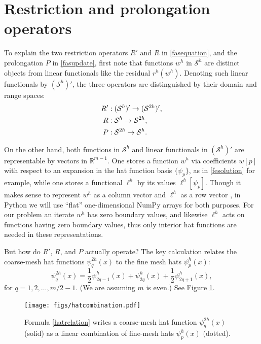 \documentclass[letterpaper,final,12pt,reqno]{amsart}
\newcommand{\RR}{\mathbb{R}}
\begin{document}
\section{Restriction and prolongation operators} \label{sec:restrictionprolongation}

To explain the two restriction operators $R'$ and $R$ in \eqref{fasequation}, and the prolongation $P$ in \eqref{fasupdate}, first note that functions $w^h$ in $\mathcal{S}^h$ are distinct objects from linear functionals like the residual $r^h(w^h)$.  Denoting such linear functionals by $(\mathcal{S}^h)'$, the three operators are distinguished by their domain and range spaces:
\begin{align}
  R' &: (\mathcal{S}^h)' \to (\mathcal{S}^{2h})', \label{rpoperators} \\
  R  &: \mathcal{S}^h \to \mathcal{S}^{2h}, \notag \\
  P  &: \mathcal{S}^{2h} \to \mathcal{S}^h. \notag
\end{align}

On the other hand, both functions in $\mathcal{S}^h$ and linear functionals in $(\mathcal{S}^h)'$ are representable by vectors in $\RR^{m-1}$.  One stores a function $w^h$ via coefficients $w[p]$ with respect to an expansion in the hat function basis $\{\psi_p\}$, as in \eqref{fesolution} for example, while one stores a functional $\ell^h$ by its values $\ell^h[\psi_p]$.  Though it makes sense to represent $w^h$ as a column vector and $\ell^h$ as a row vector \cite{TrefethenBau1997}, in Python we will use ``flat'' one-dimensional NumPy arrays \cite{Harrisetal2020} for both purposes.  For our problem an iterate $w^h$ has zero boundary values, and likewise $\ell^h$ acts on functions having zero boundary values, thus only interior hat functions are needed in these representations.

But how do $R'$, $R$, and $P$ actually operate?  The key calculation relates the coarse-mesh hat functions $\psi_q^{2h}(x)$ to the fine mesh hats $\psi_p^h(x)$:
\begin{equation}
  \psi_q^{2h}(x) = \frac{1}{2} \psi_{2q-1}^h(x) + \psi_{2q}^h(x) + \frac{1}{2} \psi_{2q+1}^h(x), \label{hatrelation}
\end{equation}
for $q=1,2,\dots,m/2-1$.  (We are assuming $m$ is even.)  See Figure \ref{fig:hatcombination}.

\begin{figure}
\texttt{[image: figs/hatcombination.pdf]}
\caption{Formula \eqref{hatrelation} writes a coarse-mesh hat function $\psi_q^{2h}(x)$ (solid) as a linear combination of fine-mesh hats $\psi_p^h(x)$ (dotted).}
\label{fig:hatcombination}
\end{figure}
\end{document}

